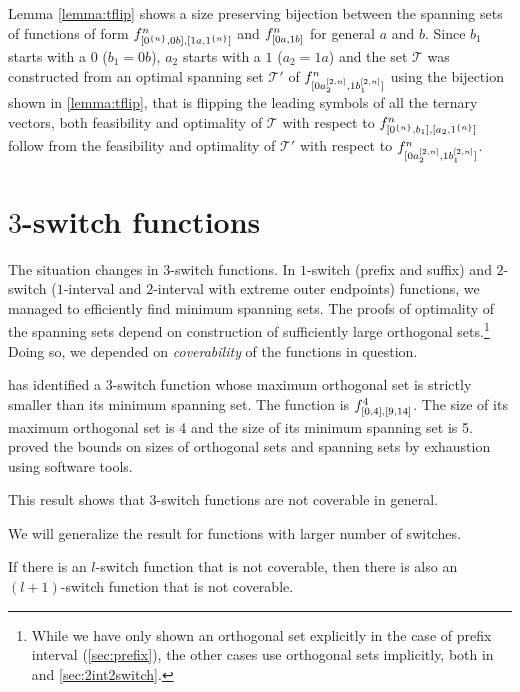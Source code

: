 Lemma \ref{lemma:tflip} shows
a size preserving
bijection
between
the spanning sets of functions of form
$f^{n}_{[0^{\{n\}}, 0 b], [1 a, 1^{\{n\}}]}$
and $f^{n}_{[0 a, 1 b]}$
for general $a$ and $b$.
Since $b_1$ starts with a $0$ ($b_1 = 0 b$),
$a_2$ starts with a $1$ ($a_2 = 1 a$)
and the set $\mathcal{T}$ was constructed
from an optimal spanning set $\mathcal{T}'$
of
$f^{n}_{[0 a_2^{[2, n]}, 1 b_1^{[2, n]}]}$
using the bijection
shown in \ref{lemma:tflip},
that is flipping the leading symbols
of all the ternary vectors,
both feasibility and optimality of $\mathcal{T}$
with respect to $f^{n}_{[0^{\{n\}}, b_1], [a_2, 1^{\{n\}}]}$
follow from the feasibility and optimality
of $\mathcal{T}'$ with respect to
$f^{n}_{[0 a_2^{[2, n]}, 1 b_1^{[2, n]}]}$.

\section{\texorpdfstring{$3$}{3}-switch functions}
\label{sec:3switch}

The situation changes in $3$-switch functions.
In $1$-switch (prefix and suffix)
and $2$-switch ($1$-interval and $2$-interval
with extreme outer endpoints)
functions,
we managed to efficiently find minimum spanning sets.
The proofs of optimality of the spanning sets
depend on construction of sufficiently large
orthogonal sets.\footnote{While we have only shown
an orthogonal set explicitly
in the case of prefix interval (\autoref{sec:prefix}),
the other cases use orthogonal sets implicitly,
both in \citep{Schieber2005154}
and \autoref{sec:2int2switch}.}
Doing so, we depended on \emph{coverability}
of the functions in question.

\citeauthor{Dubovsky2012} has identified
a $3$-switch function
whose maximum orthogonal set is strictly smaller than its
minimum spanning set.
The function is
$f^4_{[0, 4], [9, 14]}$.
The size of its maximum orthogonal set is 4
and the size of its minimum spanning set is
5.\citep[p.~32]{Dubovsky2012}
\citeauthor{Dubovsky2012} proved the bounds
on sizes of orthogonal sets and spanning sets
by exhaustion using software tools.

This result shows that $3$-switch functions
are not coverable in general.

We will generalize the result for functions
with larger number of switches.

\begin{lemma}
If there is an $l$-switch function that is not coverable,
then there is also an $(l+1)$-switch function
that is not coverable.
\end{lemma}


